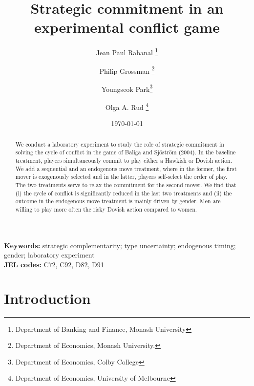 \documentclass[12pt,english]{article}
\begin{document}
\title{Strategic commitment in an experimental conflict game}

\author{Jean Paul Rabanal
\footnote{Department of Banking and Finance, Monash University}  \and Philip Grossman
\thanks{Department of Economics, Monash University.}  \and Youngseok Park\thanks{Department of Economics, Colby College} \and Olga A. Rud \footnote{Department of Economics, University of Melbourne} }\date{\today}
\maketitle
\begin{abstract}
We conduct a laboratory experiment to study the role of strategic commitment in solving the cycle of conflict in the game of Baliga and Sj\"ostr\"om (2004). In the baseline treatment, players simultaneously commit to play either a Hawkish or Dovish action. We add a sequential and an endogenous move treatment, where in the former, the first mover is exogenously selected and in the latter, players self-select the order of play. The two treatments serve to relax the commitment for the second mover. We find that (i) the cycle of conflict is significantly reduced in the last two treatments and (ii) the outcome in the endogenous move treatment is mainly driven by gender. Men are willing to play more often the risky Dovish action compared to women. 
\end{abstract}

\textbf{Keywords:}
strategic complementarity; type uncertainty; endogenous timing; gender; laboratory experiment\\
\textbf{JEL codes:} C72, C92, D82, D91
\newpage
\section{Introduction}
\label{sec:intro}
\end{document}
